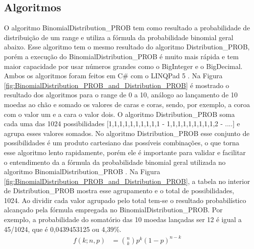 \begin{apendicesenv}
\chapter{Algoritmos}
\label{app:algoritmos}
	O algoritmo BinomialDistribution\_PROB tem como resultado a probabilidade de distribuição de um range e utiliza a fórmula  da probabilidade binomial geral abaixo. Esse algoritmo tem o mesmo resultado do algoritmo Distribution\_PROB, porém a execução do BinomialDistribution\_PROB é muito mais rápida e tem maior capacidade por usar números grandes como o BigInteger e o BigDecimal. Ambos os algoritmos foram feitos em C\# com o LINQPad 5 \footnotemark. Na Figura \ref{fig:BinomialDistribution_PROB_and_Distribution_PROB} é mostrado o resultado dos algoritmos para o range de 0 a 10, análogo ao lançamento de 10 moedas ao chão e somado os valores de caras e coras, sendo, por exemplo, a coroa com o valor um e a cara o valor dois. O algoritmo Distribution\_PROB soma cada uma das 1024 possibilidades [1,1,1,1,1,1,1,1,1,1 - 1,1,1,1,1,1,1,1,1,2 - ....] e agrupa esses valores somados. No algoritmo Distribution\_PROB esse conjunto de possibilidades é um produto cartesiano das possíveis combinações, o que torna esse algoritmo lento rapidamente, porém ele é importante para validar e facilitar o entendimento da a fórmula da probabilidade binomial geral utilizada no algoritmo BinomialDistribution\_PROB \cite{mathisfun_binomial_distribution}. Na Figura \ref{fig:BinomialDistribution_PROB_and_Distribution_PROB}, a tabela no interior de  Distribution\_PROB mostra esse agrupamento e o total de possibilidades, 1024. Ao dividir cada valor agrupado pelo total tem-se o resultado probabilístico alcançado pela fórmula empregada no BinomialDistribution\_PROB. Por exemplo, a probabilidade do somatório das 10 moedas lançadas ser 12 é igual a 45/1024, que é 0,0439453125 ou 4,39\%.
\begin{align*}
f(k;n,p) &= \binom{n}{k} p^k(1 - p)^{n-k}
\end{align*}


\end{apendicesenv}
